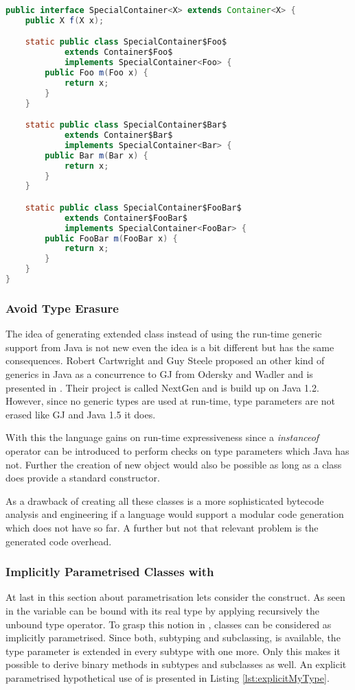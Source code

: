 \begin{lstlisting}[float,language=java,caption=Extending a container class translated to Java,label=lst:extendingContainer]
public interface SpecialContainer<X> extends Container<X> {
	public X f(X x);

	static public class SpecialContainer$Foo$ 
			extends Container$Foo$ 
			implements SpecialContainer<Foo> {
		public Foo m(Foo x) {
			return x;
		}
	}

	static public class SpecialContainer$Bar$ 
			extends Container$Bar$ 
			implements SpecialContainer<Bar> {
		public Bar m(Bar x) {
			return x;
		}
	}

	static public class SpecialContainer$FooBar$ 
			extends Container$FooBar$ 
			implements SpecialContainer<FooBar> {
		public FooBar m(FooBar x) {
			return x;
		}
	}
}
\end{lstlisting}

\subsubsection{Avoid Type Erasure}
The idea of generating extended class instead of using the run-time
generic support from Java is not new even the idea is a bit different
but has the same consequences. Robert Cartwright and Guy Steele proposed
an other kind of generics in Java as a concurrence to GJ from Odersky
and Wadler and is presented in \cite{cartwright_compatible_1998}. Their
project is called NextGen and is build up on Java 1.2. However, since
no generic types are used at run-time, type parameters are not erased
like GJ and Java 1.5 it does.

With this the language gains on run-time expressiveness since a
\emph{instanceof} operator can be introduced to perform checks on type
parameters which Java has not. Further the creation of new object would
also be possible as long as a class does provide a standard constructor.

As a drawback of creating all these classes is a more sophisticated 
bytecode analysis and engineering if a language would support a modular
code generation which \ooplss does not have so far. A further but not 
that relevant problem is the generated code overhead.

\subsubsection{Implicitly Parametrised Classes with \mytype}
At last in this section about parametrisation lets consider the \mytype
construct. As seen in  the \self variable
can be bound with its real type by applying recursively the unbound type
operator. To grasp this notion in \ooplss, classes can be considered
as implicitly parametrised. Since both, subtyping and subclassing, is
available, the type parameter is extended in every subtype with one more.
Only this makes it possible to derive binary methods in subtypes
and subclasses as well. An explicit parametrised hypothetical use of
\mytype is presented in Listing \ref{lst:explicitMyType}.

